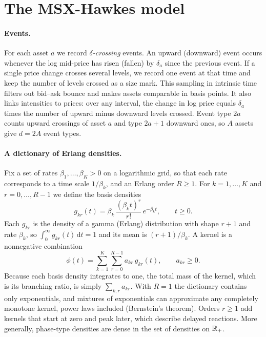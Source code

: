 \section{The MSX-Hawkes model}\label{sec:model}

\paragraph{Events.} For each asset $a$ we record \emph{$\delta$-crossing} events. An upward
(downward) event occurs whenever the log mid-price has risen (fallen) by $\delta_a$ since the
previous event. If a single price change crosses several levels, we record one event at that time
and keep the number of levels crossed as a size mark. This sampling in intrinsic time filters out
bid--ask bounce and makes assets comparable in basis points. It also links intensities to prices:
over any interval, the change in log price equals $\delta_a$ times the number of upward minus
downward levels crossed. Event type $2a$ counts upward crossings of asset $a$ and type $2a+1$
downward ones, so $A$ assets give $d=2A$ event types.

\paragraph{A dictionary of Erlang densities.} Fix a set of rates $\beta_1,\dots,\beta_K>0$ on a
logarithmic grid, so that each rate corresponds to a time scale $1/\beta_k$, and an Erlang order
$R\ge1$. For $k=1,\dots,K$ and $r=0,\dots,R-1$ we define the basis densities
\begin{equation}\label{eq:basis}
g_{kr}(t)=\beta_k\,\frac{(\beta_k t)^r}{r!}\,e^{-\beta_k t},\qquad t\ge0 .
\end{equation}
Each $g_{kr}$ is the density of a gamma (Erlang) distribution with shape $r+1$ and rate
$\beta_k$, so $\int_0^\infty g_{kr}(t)\,\mathrm{d}t=1$ and its mean is $(r+1)/\beta_k$. A kernel is a
nonnegative combination
\begin{equation}\label{eq:kernel}
\phi(t)=\sum_{k=1}^{K}\sum_{r=0}^{R-1}a_{kr}\,g_{kr}(t),\qquad a_{kr}\ge0 .
\end{equation}
Because each basis density integrates to one, the total mass of the kernel, which is its
branching ratio, is simply $\sum_{k,r}a_{kr}$. With $R=1$ the dictionary contains only
exponentials, and mixtures of exponentials can approximate any completely monotone kernel,
power laws included (Bernstein's theorem). Orders $r\ge1$ add kernels that start at zero and peak
later, which describe delayed reactions. More generally, phase-type densities are dense in the set
of densities on $\mathbb{R}_+$.

